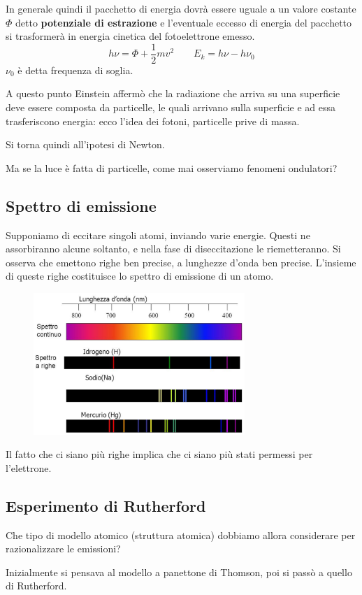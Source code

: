 In generale quindi il pacchetto di energia dovrà essere uguale a un valore costante $\Phi$ detto \textbf{potenziale di estrazione} e l'eventuale eccesso di energia del pacchetto si trasformerà in energia cinetica del fotoelettrone emesso.
$$h\nu=\Phi+\frac{1}{2}mv^2 \qquad E_k=h\nu-h\nu_0$$
$\nu_0$ è detta frequenza di soglia.

A questo punto Einstein affermò che la radiazione che arriva su una superficie deve essere composta da particelle, le quali arrivano sulla superficie e ad essa trasferiscono energia: ecco l'idea dei fotoni, particelle prive di massa.

Si torna quindi all'ipotesi di Newton.

Ma se la luce è fatta di particelle, come mai osserviamo fenomeni ondulatori?
\subsection{Spettro di emissione}
Supponiamo di eccitare singoli atomi, inviando varie energie. Questi ne assorbiranno alcune soltanto, e nella fase di diseccitazione le riemetteranno. Si osserva che emettono righe ben precise, a lunghezze d'onda ben precise. L'insieme di queste righe costituisce lo spettro di emissione di un atomo.

\begin{figure}[htp]
  \centering
  \includegraphics[width=8cm]{immagini/spettro_emissione.png}
\end{figure}

Il fatto che ci siano più righe implica che ci siano più stati permessi per l'elettrone.
\subsection{Esperimento di Rutherford}
Che tipo di modello atomico (struttura atomica) dobbiamo allora considerare per razionalizzare le emissioni?

Inizialmente si pensava al modello a panettone di Thomson, poi si passò a quello di Rutherford.


